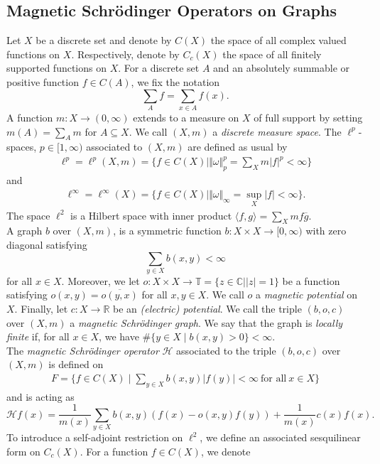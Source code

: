 \documentclass[10pt]{amsart}
\theoremstyle{definition}
\begin{document}
\subsection{Magnetic Schrödinger Operators on Graphs}
Let $X$ be a discrete set and denote by $C(X)$ the space of all complex valued functions on $X.$ Respectively, denote by $C_c(X)$ the space of all finitely supported functions on $X.$ For a discrete set $A$ and an absolutely summable or positive function $f\in C(A)$, we fix the notation
\[\sum_A f =\sum_{x\in A} f(x).\]
A function $m:X\rightarrow(0,\infty)$ extends to a measure on $X$ of full support by setting  $m(A)=\sum_{  A}m $ for $A\subseteq X.$ We call $(X,m)$ a \textit{discrete measure space}. The $\ell^p$-spaces, $p\in [1,\infty)$ associated to $(X,m)$ are defined as usual by  
\begin{align*}
    \ell^p=\ell^p(X,m)=\Big\{ f\in C(X)\mid \Vert \omega\Vert_p^p=\sum_{X}m \vert f \vert^p <\infty\Big\}
\end{align*}
and
\begin{align*}
   \ell^\infty=\ell^\infty(X)=\Big\{f\in C(X)\mid \Vert \omega\Vert_\infty=\sup_{X}\vert f \vert <\infty\Big\}.
\end{align*}
The space $\ell^2$ is a Hilbert space with inner product  $\langle f,g\rangle = \sum_X mf\overline{g}.$\\
A graph $b$ over $(X,m)$, is a symmetric function   $b :X\times X\rightarrow[0,\infty)$  with zero diagonal satisfying \[\sum_{y\in X}b(x,y)<\infty\] for all $x\in X$. Moreover, we let $o: X\times X\rightarrow\mathbb{T} = \{z\in\mathbb{C}\mid \vert z\vert = 1\}$ be a function satisfying $o (x,y) = \overline{o(y,x)}$ for all $x,y\in X.$ We call $o$ a \textit{magnetic potential} on $X.$ Finally, let $c:X\rightarrow\mathbb{R}$ be an \emph{(electric) potential}. We call the triple $(b,o,c)$ over $(X,m)$ a \textit{magnetic Schrödinger graph}. We say that the graph is \emph{locally finite} if, for all $x\in X$, we have $\#\lbrace y\in X\mid b(x,y)> 0\rbrace<\infty.$\\
The \textit{magnetic Schrödinger operator} $\mathcal{H}$ associated to the triple $(b,o,c)$ over $(X,m)$ is defined on
\begin{align*}
    F=\{ f\in C(X)\mid \sum_{y\in X}b(x,y)\vert f(y)\vert <\infty~\text{for all}~x\in X\}
\end{align*}
and is acting as
\[\mathcal{H}f(x) = \frac{1}{m(x)}\sum_{y\in X}b(x,y)\left(f(x)-o(x,y)f(y)\right)+\frac{1}{m(x)}c(x)f(x).\]
To introduce a self-adjoint restriction on $\ell^2$, we define an associated sesquilinear form on $C_c(X)$. For a function $f\in C(X)$, we denote
\end{document}
